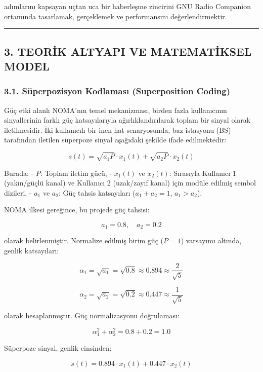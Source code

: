 \documentclass[
]{IEEEtran}
\begin{document}
adımlarını kapsayan uçtan uca bir haberleşme zincirini GNU Radio
Companion ortamında tasarlamak, gerçeklemek ve performansını
değerlendirmektir.

\begin{center}\rule{0.5\linewidth}{0.5pt}\end{center}

\subsection{3. TEORİK ALTYAPI VE MATEMATİKSEL
MODEL}\label{teorik-altyapi-ve-matematiksel-model}

\subsubsection{3.1. Süperpozisyon Kodlaması (Superposition
Coding)}\label{suxfcperpozisyon-kodlamasux131-superposition-coding}

Güç etki alanlı NOMA'nın temel mekanizması, birden fazla kullanıcının
sinyallerinin farklı güç katsayılarıyla ağırlıklandırılarak toplam bir
sinyal olarak iletilmesidir. İki kullanıcılı bir inen hat senaryosunda,
baz istasyonu (BS) tarafından iletilen süperpoze sinyal aşağıdaki
şekilde ifade edilmektedir:

\[s(t) = \sqrt{a_1 P} \cdot x_1(t) + \sqrt{a_2 P} \cdot x_2(t)\]

Burada: - \(P\): Toplam iletim gücü, - \(x_1(t)\) ve \(x_2(t)\):
Sırasıyla Kullanıcı 1 (yakın/güçlü kanal) ve Kullanıcı 2 (uzak/zayıf
kanal) için modüle edilmiş sembol dizileri, - \(a_1\) ve \(a_2\): Güç
tahsis katsayıları (\(a_1 + a_2 = 1\), \(a_1 > a_2\)).

NOMA ilkesi gereğince, bu projede güç tahsisi:

\[a_1 = 0.8, \quad a_2 = 0.2\]

olarak belirlenmiştir. Normalize edilmiş birim güç (\(P = 1\)) varsayımı
altında, genlik katsayıları:

\[\alpha_1 = \sqrt{a_1} = \sqrt{0.8} \approx 0.894 \approx \frac{2}{\sqrt{5}}\]

\[\alpha_2 = \sqrt{a_2} = \sqrt{0.2} \approx 0.447 \approx \frac{1}{\sqrt{5}}\]

olarak hesaplanmıştır. Güç normalizasyonu doğrulaması:

\[\alpha_1^2 + \alpha_2^2 = 0.8 + 0.2 = 1.0\]

Süperpoze sinyal, genlik cinsinden:

\[s(t) = 0.894 \cdot x_1(t) + 0.447 \cdot x_2(t)\]
\end{document}
